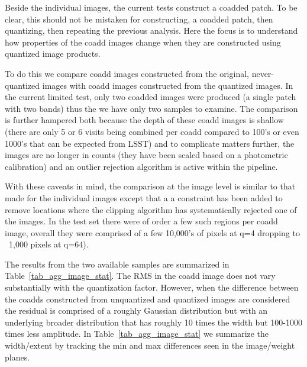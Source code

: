 Beside the individual images, the current tests construct a coadded patch.  
To be clear, this should not be mistaken for constructing, a coadded patch, 
then quantizing, then repeating the previous analysis.  Here the focus is to
understand how properties of the coadd images change when they are constructed
using quantized image products. 

To do this we compare coadd images constructed from the original, 
never-quantized images with coadd images constructed from the quantized images.
In the current limited test, only two coadded images were produced (a single patch 
with two bands) thus the we have only two samples to examine. 
The comparison is further hampered both because the depth of these coadd images 
is shallow (there are only 5 or 6 visits being combined per coadd compared to 100's 
or even 1000's that can be expected from LSST) and to complicate matters further,
the images are no longer in counts (they have been scaled based on a photometric
calibration) and an outlier rejection algorithm is active within the pipeline. 

With these caveats in mind, the comparison at the image level is similar to that made for 
the individual images except that a a constraint has been added to 
remove locations where the clipping algorithm has systematically rejected one of the images.
In the test set there were of order a few such regions per coadd image, overall they were
comprised of a few 10,000's of pixels at q=4 dropping to ~1,000 pixels at q=64).


The results from the two available samples are summarized in Table~\ref{tab_agg_image_stat}.
The RMS in the coadd image does not vary substantially with the quantization factor.  However, 
when the difference between the coadds constructed from unquantized and quantized images are 
considered the residual is comprised of a roughly Gaussian distribution but with an underlying 
broader distribution that has roughly 10 times the width but 100-1000 times less amplitude.  
In Table~\ref{tab_agg_image_stat} we summarize the width/extent by tracking the min and max differences 
seen in the image/weight planes.


